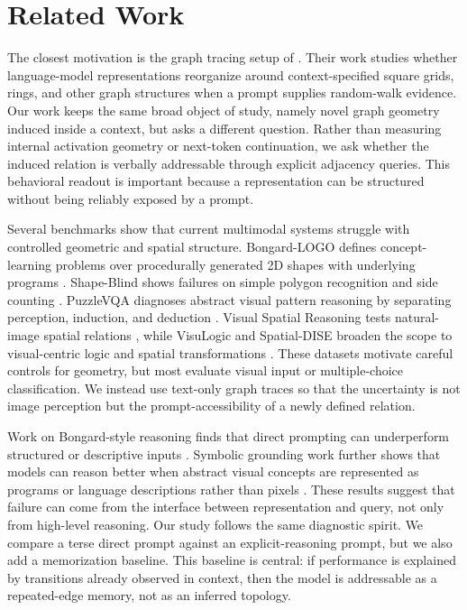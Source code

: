 \section{Related Work}
\label{sec:related_work}

The closest motivation is the graph tracing setup of \citet{park2025iclr}. Their work studies whether language-model representations reorganize around context-specified square grids, rings, and other graph structures when a prompt supplies random-walk evidence. Our work keeps the same broad object of study, namely novel graph geometry induced inside a context, but asks a different question. Rather than measuring internal activation geometry or next-token continuation, we ask whether the induced relation is verbally addressable through explicit adjacency queries. This behavioral readout is important because a representation can be structured without being reliably exposed by a prompt.

Several benchmarks show that current multimodal systems struggle with controlled geometric and spatial structure. Bongard-LOGO defines concept-learning problems over procedurally generated 2D shapes with underlying programs \cite{nie2020bongard}. Shape-Blind shows failures on simple polygon recognition and side counting \cite{rudman2025forgotten}. PuzzleVQA diagnoses abstract visual pattern reasoning by separating perception, induction, and deduction \cite{chia2024puzzlevqa}. Visual Spatial Reasoning tests natural-image spatial relations \cite{liu2023visual}, while VisuLogic and Spatial-DISE broaden the scope to visual-centric logic and spatial transformations \cite{xu2025visulogic,huang2025spatial}. These datasets motivate careful controls for geometry, but most evaluate visual input or multiple-choice classification. We instead use text-only graph traces so that the uncertainty is not image perception but the prompt-accessibility of a newly defined relation.

Work on Bongard-style reasoning finds that direct prompting can underperform structured or descriptive inputs \cite{malkinski2024reasoning}. Symbolic grounding work further shows that models can reason better when abstract visual concepts are represented as programs or language descriptions rather than pixels \cite{vaishnav2026symbolic}. These results suggest that failure can come from the interface between representation and query, not only from high-level reasoning. Our study follows the same diagnostic spirit. We compare a terse direct prompt against an explicit-reasoning prompt, but we also add a memorization baseline. This baseline is central: if performance is explained by transitions already observed in context, then the model is addressable as a repeated-edge memory, not as an inferred topology.
